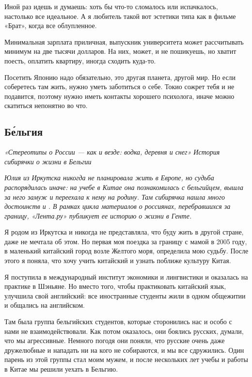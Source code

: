 Иной раз идешь и думаешь: хоть бы что-то сломалось или испачкалось, настолько все идеальное. А я любитель такой вот эстетики типа как в фильме «Брат», когда все облупленное.

Минимальная зарплата приличная, выпускник университета может рассчитывать минимум на две тысячи долларов. На них, может, и не пошикуешь, но хватит поесть, оплатить квартиру, иногда сходить куда-то.

Посетить Японию надо обязательно, это другая планета, другой мир. Но если соберетесь там жить, нужно уметь заботиться о себе. Токио сожрет тебя и не подавится, поэтому нужно иметь контакты хорошего психолога, иначе можно скатиться непонятно во что.

\newpage
\subsection{Б\'{е}льгия}
\textit{«Стереотипы о России — как и везде: водка, деревня и снег» История сибирячки о жизни в Бельгии}

\textit{Юлия из Иркутска никогда не планировала жить в Европе, но судьба распорядилась иначе: на учебе в Китае она познакомилась с бельгийцем, вышла за него замуж и переехала к нему на родину. Там сибирячка нашла много достоинств и . В рамках цикла материалов о россиянах, перебравшихся за границу, «Лента.ру» публикует ее историю о жизни в Генте.}

Я родом из Иркутска и никогда не представляла, что буду жить в другой стране, даже не мечтала об этом. Но первая моя поездка за границу с мамой в 2005 году, в маленький китайский город возле Желтого моря, определила мою судьбу. После этого я поняла, что хочу учить китайский и узнать поближе культуру Китая.

Я поступила в международный институт экономики и лингвистики и оказалась на практике в Шэньяне. Но вместо того, чтобы практиковать китайский язык, улучшила свой английский: все иностранные студенты жили в одном общежитии и общались на английском.

Там была группа бельгийских студентов, которые сторонились нас и особо с нами не взаимодействовали. Как потом оказалось, они боялись русских, думали, что мы агрессивные. Немного погодя они поняли, что русские очень даже дружелюбные и нападать ни на кого не собираются, и мы все сдружились. Один парень из этой группы стал моим мужем, и после нескольких лет учебы и работы в Китае мы решили уехать в Бельгию.

